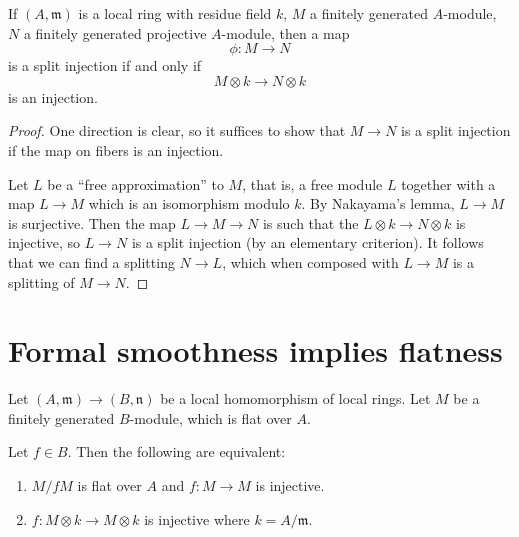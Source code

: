 \begin{lemma} 
If $(A, \mathfrak{m})$ is a local ring with residue field $k$, $M$ a finitely
generated $A$-module, $N$ a finitely
generated projective $A$-module, then a map
\[ \phi: M \to N  \]
is a split injection if and only if
\[ M \otimes k \to N \otimes k  \]
is an injection.
\end{lemma} 
\begin{proof} 
One direction is clear, so it suffices to show that $M \to N$ is a split
injection if the map on fibers is an injection.


Let $L$ be a ``free approximation'' to $M$, that is, a free module $L$ together
with a map $L \to M$ which is an isomorphism modulo $k$. By Nakayama's lemma,
$L \to M$ is surjective.
Then the map
$L \to M \to N$ is such that the $L \otimes k \to N \otimes k$ is injective, so
$L \to N$ is a split injection (by an elementary criterion).
It follows that we can find a splitting $N \to L$, which when composed with $L
\to M$ is a splitting of $M \to N$.
\end{proof}
\section{Formal smoothness implies flatness}

\begin{lemma} 
Let $(A, \mathfrak{m}) \to (B, \mathfrak{n})$ be a local homomorphism of local
rings.
Let $M$ be a finitely generated $B$-module, which is flat over $A$. 

Let $f \in B$. Then the following are equivalent:
\begin{enumerate}
\item $M/fM$ is flat over $A$ and $f: M \to M$ is injective.
\item $f: M \otimes k \to M \otimes k$ is injective where $k = A/\mathfrak{m}$.
\end{enumerate}
\end{lemma} 

